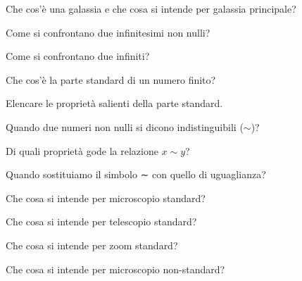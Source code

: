\begin{multicols}{2}
\begin{esercizio}\label{ese:iper_023}
Che cos'è una galassia e che cosa si intende per galassia principale?
\end{esercizio}

\begin{esercizio}\label{ese:iper_024}
Come si confrontano due infinitesimi non nulli?
\end{esercizio}

\begin{esercizio}\label{ese:iper_025}
Come si confrontano due infiniti?
\end{esercizio}

\begin{esercizio}\label{ese:iper_026}
Che cos'è la parte standard di un numero finito?
\end{esercizio}

\begin{esercizio}\label{ese:iper_027}
Elencare le proprietà salienti della parte standard.
\end{esercizio}

\begin{esercizio}\label{ese:iper_028}
Quando due numeri non nulli si dicono indistinguibili (\(\sim\))?
\end{esercizio}

\begin{esercizio}\label{ese:iper_029}
Di quali proprietà gode la relazione \(x \sim y\)?
\end{esercizio}

\begin{esercizio}\label{ese:iper_030}
Quando sostituiamo il simbolo ∼ con quello di uguaglianza?
\end{esercizio}

\begin{esercizio}\label{ese:iper_031}
Che cosa si intende per microscopio standard?
\end{esercizio}

\begin{esercizio}\label{ese:iper_032}
Che cosa si intende per telescopio standard?
\end{esercizio}

\begin{esercizio}\label{ese:iper_033}
Che cosa si intende per zoom standard?
\end{esercizio}

\begin{esercizio}\label{ese:iper_034}
Che cosa si intende per microscopio non-standard?
\end{esercizio}


\end{multicols}
